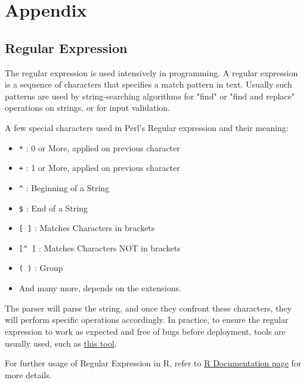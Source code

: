 \section{Appendix}
\label{section:appendix}

\subsection{Regular Expression}
\label{section:appendix:regex}
The regular expression is used intensively in programming. A regular expression is a sequence of characters that 
specifies a match pattern in text. Usually such patterns are used by string-searching algorithms for "find" 
or "find and replace" operations on strings, or for input validation.

A few special characters used in Perl's Regular expression and their meaning:
\begin{itemize}
    \item \verb|*| : 0 or More, applied on previous character
    \item \verb|+| : 1 or More, applied on previous character
    \item \verb|^| : Beginning of a String
    \item \verb|$| : End of a String
    \item \verb|[ ]| : Matches Characters in brackets
    \item \verb|[^ ]| : Matches Characters NOT in brackets
    \item \verb|( )| : Group
    \item And many more, depends on the extensions.
\end{itemize}

The parser will parse the string, and once they confront these characters, they will perform specific operations
accordingly. In practice, to ensure the regular expression to work as expected and free of bugs before deployment, tools are usually
used, such as \href{https://regex101.com/}{this tool}.

For further usage of Regular Expression in R, refer to \href{https://stat.ethz.ch/R-manual/R-devel/library/base/html/regex.html}{R Documentation page} for more details.









